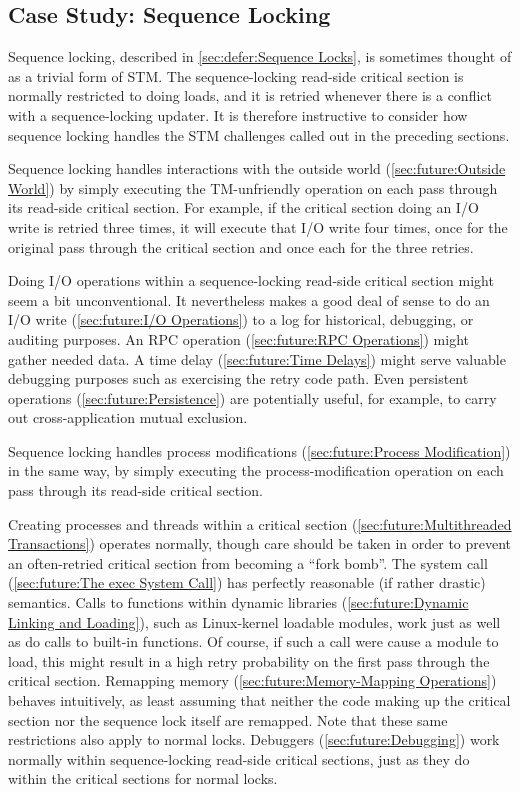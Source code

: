 \subsection{Case Study:
	    Sequence Locking}
\label{sec:future:Case Study: Sequence Locking}

Sequence locking, described in
\cref{sec:defer:Sequence Locks},
is sometimes thought of as a trivial form of STM\@.
The sequence-locking read-side critical section is normally restricted
to doing loads, and it is retried whenever there is a conflict with a
sequence-locking updater.
It is therefore instructive to consider how sequence locking handles
the STM challenges called out in the preceding sections.

Sequence locking handles interactions with the outside world
(\cref{sec:future:Outside World}) by simply executing the
TM-unfriendly operation on each pass through its read-side
critical section.
For example, if the critical section doing an I/O write
is retried three times, it will execute that I/O write four
times, once for the original pass through the critical
section and once each for the three retries.

Doing I/O operations within a sequence-locking read-side
critical section might seem a bit unconventional.
It nevertheless makes a good deal of sense to do
an I/O write (\cref{sec:future:I/O Operations})
to a log for historical, debugging, or auditing purposes.
An RPC operation (\cref{sec:future:RPC Operations}) might gather needed data.
A time delay (\cref{sec:future:Time Delays}) might serve valuable
debugging purposes such as exercising the retry code path.
Even persistent operations (\cref{sec:future:Persistence}) are potentially
useful, for example, to carry out cross-application mutual exclusion.

Sequence locking handles process modifications
(\cref{sec:future:Process Modification})
in the same way, by simply executing the process-modification operation
on each pass through its read-side critical section.

Creating processes and threads within a critical section
(\cref{sec:future:Multithreaded Transactions})
operates normally, though care should be taken in order to prevent
an often-retried critical section from becoming a ``fork bomb''.
The  system call (\cref{sec:future:The exec System Call})
has perfectly reasonable (if rather drastic) semantics.
Calls to functions within dynamic libraries
(\cref{sec:future:Dynamic Linking and Loading}),
such as Linux-kernel loadable modules, work just as well as do calls
to built-in functions.
Of course, if such a call were cause a module to load, this might result
in a high retry probability on the first pass through the critical
section.
Remapping memory (\cref{sec:future:Memory-Mapping Operations})
behaves intuitively, as least assuming that neither the code making
up the critical section nor the sequence lock itself are remapped.
Note that these same restrictions also apply to normal locks.
Debuggers (\cref{sec:future:Debugging})
work normally within sequence-locking read-side critical sections,
just as they do within the critical sections for normal locks.

